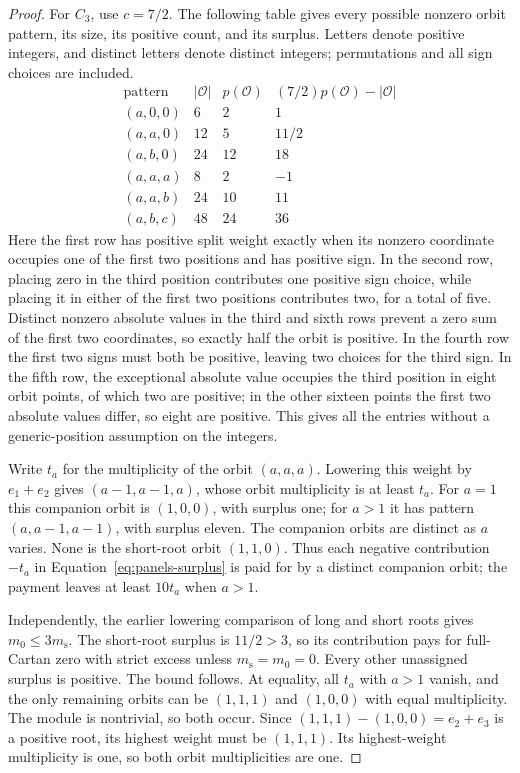 \begin{proof}
For $C_3$, use $c=7/2$. The following table gives every possible
nonzero orbit pattern, its size, its positive count, and its surplus.
Letters denote positive integers, and distinct letters denote
distinct integers; permutations and all sign choices are included.
\[
\begin{array}{c|r|r|r}
 \text{pattern}&|\mathcal O|&p(\mathcal O)&
                    (7/2)p(\mathcal O)-|\mathcal O|\\ \hline
 (a,0,0)&6&2&1\\
 (a,a,0)&12&5&11/2\\
 (a,b,0)&24&12&18\\
 (a,a,a)&8&2&-1\\
 (a,a,b)&24&10&11\\
 (a,b,c)&48&24&36
\end{array}
\]
Here the first row has positive split weight exactly when its
nonzero coordinate occupies one of the first two positions and
has positive sign. In the second row, placing zero in the third
position contributes one positive sign choice, while placing it
in either of the first two positions contributes two, for a total
of five. Distinct nonzero absolute values in the third and sixth
rows prevent a zero sum of the first two coordinates, so exactly
half the orbit is positive. In the fourth row the first two signs
must both be positive, leaving two choices for the third sign.
In the fifth row, the exceptional absolute value occupies the
third position in eight orbit points, of which two are positive;
in the other sixteen points the first two absolute values differ,
so eight are positive. This gives all the entries without a
generic-position assumption on the integers.

Write $t_a$ for the multiplicity of the orbit $(a,a,a)$.
Lowering this weight by $e_1+e_2$ gives
$(a-1,a-1,a)$, whose orbit multiplicity is at least $t_a$.
For $a=1$ this companion orbit is $(1,0,0)$, with surplus one;
for $a>1$ it has pattern $(a,a-1,a-1)$, with surplus eleven.
The companion orbits are distinct as $a$ varies. None is the
short-root orbit $(1,1,0)$. Thus each negative contribution
$-t_a$ in Equation~\eqref{eq:panels-surplus} is paid for by a
distinct companion orbit; the payment leaves at least $10t_a$
when $a>1$.

Independently, the earlier lowering comparison of long and short
roots gives $m_0\leq3m_{\mathrm s}$. The short-root surplus
is $11/2>3$, so its contribution pays for full-Cartan zero with
strict excess unless $m_{\mathrm s}=m_0=0$. Every other
unassigned surplus is positive. The bound follows. At equality,
all $t_a$ with $a>1$ vanish, and the only remaining orbits can be
$(1,1,1)$ and $(1,0,0)$ with equal multiplicity. The module is
nontrivial, so both occur. Since $(1,1,1)-(1,0,0)=e_2+e_3$
is a positive root, its highest weight must be $(1,1,1)$.
Its highest-weight multiplicity is one, so both orbit
multiplicities are one.


\end{proof}
